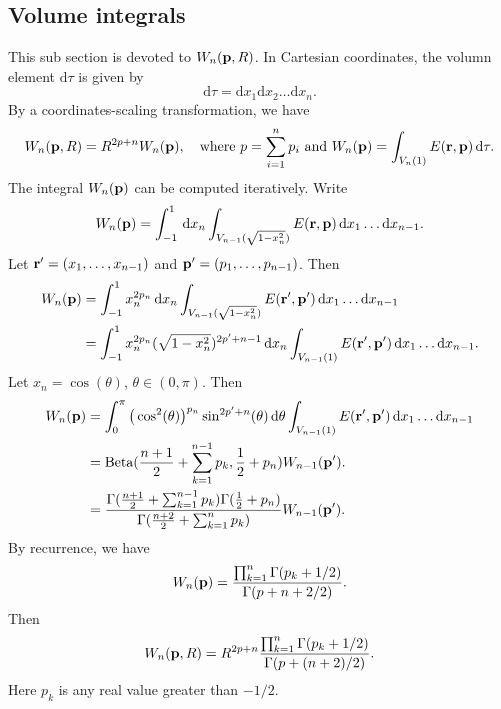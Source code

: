 \documentclass[11pt, letterpaper]{article}
\theoremstyle{plain}
\theoremstyle{definition}
\theoremstyle{remark}
\begin{document}
\subsection{Volume integrals}
This sub section is devoted to $W_n(\mathbf{p},R)$.
In Cartesian coordinates, the volumn element $\mathrm{d}\tau $ is given by
$$
\mathrm{d}\tau=\mathrm{d}x_1\mathrm{d}x_2\ldots\mathrm{d}x_n.
$$
By a coordinates-scaling transformation, we have
$$
W_n(\mathbf{p},R)=R^{2p+n}W_n(\mathbf{p}), \quad \text{where $p=\sum_{i=1}^n p_i$ and }W_n(\mathbf{p})=\int_{V_n(1)}E(\mathbf{r},\mathbf{p})\,\mathrm{d}\tau.
$$
The integral $W_n(\mathbf{p})$ can be computed iteratively. Write
$$
W_n(\mathbf{p})=\int_{-1}^1\,\mathrm{d}x_n \int_{V_{n-1}(\sqrt{1-x_n^2})}E(\mathbf{r},\mathbf{p})\,\mathrm{d}x_1\ldots\mathrm{d}x_{n-1}.
$$
Let $\mathbf{r}'=(x_1,\ldots,x_{n-1})$ and $\mathbf{p}'=(p_1,\ldots,p_{n-1})$. Then
$$
\begin{aligned}
    W_n(\mathbf{p})&=\int_{-1}^1 x_n^{2p_n}\,\mathrm{d}x_n \int_{V_{n-1}(\sqrt{1-x_n^2})}E(\mathbf{r}',\mathbf{p}')\,\mathrm{d}x_1\ldots\mathrm{d}x_{n-1}\\
    &=
    \int_{-1}^1 x_n^{2p_n} (\sqrt{1-x_n^2})^{2p'+n-1}\,\mathrm{d}x_n \int_{V_{n-1}(1)}E(\mathbf{r}',\mathbf{p}')\,\mathrm{d}x_1\ldots\mathrm{d}x_{n-1}.
\end{aligned}
$$
Let $x_n=\cos(\theta)$, $\theta\in(0,\pi)$. Then 
$$
\begin{aligned}
    W_n(\mathbf{p})
    &=
    \int_{0}^{\pi} \big(\cos^{2}(\theta)\big)^{p_n} \sin^{2p'+n}(\theta)\,\mathrm{d}\theta \int_{V_{n-1}(1)}E(\mathbf{r}',\mathbf{p}')\,\mathrm{d}x_1\ldots\mathrm{d}x_{n-1}\\
    &=\text{Beta}(\frac{n+1}{2}+\sum_{k=1}^{n-1}p_k, \frac{1}{2}+p_n) W_{n-1}(\mathbf{p}').\\
    &=\frac{\Gamma(\frac{n+1}{2}+\sum_{k=1}^{n-1}p_k)\Gamma (\frac{1}{2}+p_n)}{\Gamma(\frac{n+2}{2}+\sum_{k=1}^n p_k)} W_{n-1}(\mathbf{p}').\\
\end{aligned}
$$
By recurrence, we have
$$
W_n(\mathbf{p})=\frac{\prod_{k=1}^n \Gamma(p_k+1/2)}{\Gamma(p+{n+2}/{2})}.
$$
Then
\begin{equation}\label{eq:2}
W_n(\mathbf{p},R)=R^{2p+n}\frac{\prod_{k=1}^n \Gamma(p_k+1/2)}{\Gamma(p+{(n+2)}/{2})}.
\end{equation}
Here $p_k$ is any real value greater than $-1/2$.
\end{document}
